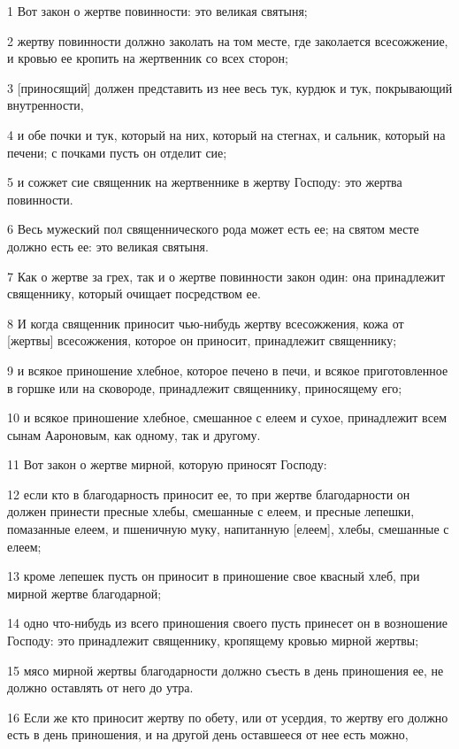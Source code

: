 \par 1 Вот закон о жертве повинности: это великая святыня;
\par 2 жертву повинности должно заколать на том месте, где заколается всесожжение, и кровью ее кропить на жертвенник со всех сторон;
\par 3 [приносящий] должен представить из нее весь тук, курдюк и тук, покрывающий внутренности,
\par 4 и обе почки и тук, который на них, который на стегнах, и сальник, который на печени; с почками пусть он отделит сие;
\par 5 и сожжет сие священник на жертвеннике в жертву Господу: это жертва повинности.
\par 6 Весь мужеский пол священнического рода может есть ее; на святом месте должно есть ее: это великая святыня.
\par 7 Как о жертве за грех, так и о жертве повинности закон один: она принадлежит священнику, который очищает посредством ее.
\par 8 И когда священник приносит чью-нибудь жертву всесожжения, кожа от [жертвы] всесожжения, которое он приносит, принадлежит священнику;
\par 9 и всякое приношение хлебное, которое печено в печи, и всякое приготовленное в горшке или на сковороде, принадлежит священнику, приносящему его;
\par 10 и всякое приношение хлебное, смешанное с елеем и сухое, принадлежит всем сынам Аароновым, как одному, так и другому.
\par 11 Вот закон о жертве мирной, которую приносят Господу:
\par 12 если кто в благодарность приносит ее, то при жертве благодарности он должен принести пресные хлебы, смешанные с елеем, и пресные лепешки, помазанные елеем, и пшеничную муку, напитанную [елеем], хлебы, смешанные с елеем;
\par 13 кроме лепешек пусть он приносит в приношение свое квасный хлеб, при мирной жертве благодарной;
\par 14 одно что-нибудь из всего приношения своего пусть принесет он в возношение Господу: это принадлежит священнику, кропящему кровью мирной жертвы;
\par 15 мясо мирной жертвы благодарности должно съесть в день приношения ее, не должно оставлять от него до утра.
\par 16 Если же кто приносит жертву по обету, или от усердия, то жертву его должно есть в день приношения, и на другой день оставшееся от нее есть можно,
